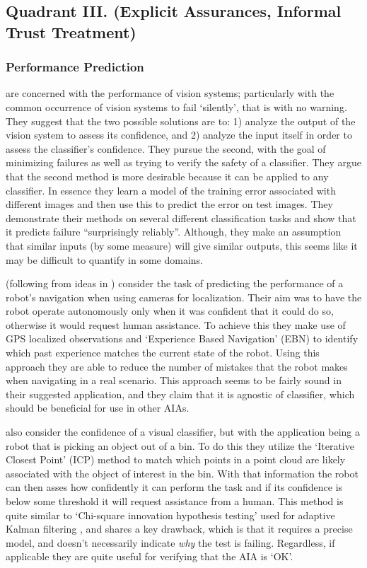 \subsection{Quadrant III. (Explicit Assurances, Informal Trust Treatment)}\label{sec:q3}
\subsubsection{Performance Prediction} \label{sec:performance_prediction}
    \citet{Zhang2014-he} are concerned with the performance of vision systems; particularly with the common occurrence of vision systems to fail `silently', that is with no warning. They suggest that the two possible solutions are to: 1) analyze the output of the vision system to assess its confidence, and 2) analyze the input itself in order to assess the classifier's confidence. They pursue the second, with the goal of minimizing failures as well as trying to verify the safety of a classifier. They argue that the second method is more desirable because it can be applied to any classifier. In essence they learn a model of the training error associated with different images and then use this to predict the error on test images. They demonstrate their methods on several different classification tasks and show that it predicts failure ``surprisingly reliably''. Although, they make an assumption that similar inputs (by some measure) will give similar outputs, this seems like it may be difficult to quantify in some domains.

    \citet{Gurau2016-hs} (following from ideas in \citet{Churchill2015-ei}) consider the task of predicting the performance of a robot's navigation when using cameras for localization. Their aim was to have the robot operate autonomously only when it was confident that it could do so, otherwise it would request human assistance. To achieve this they make use of GPS localized observations and `Experience Based Navigation' (EBN) to identify which past experience matches the current state of the robot. Using this approach they are able to reduce the number of mistakes that the robot makes when navigating in a real scenario. This approach seems to be fairly sound in their suggested application, and they claim that it is agnostic of classifier, which should be beneficial for use in other AIAs.

    \citet{Kaipa2015-hy} also consider the confidence of a visual classifier, but with the application being a robot that is picking an object out of a bin. To do this they utilize the `Iterative Closest Point' (ICP) method to match which points in a point cloud are likely associated with the object of interest in the bin. With that information the robot can then asses how confidently it can perform the task and if its confidence is below some threshold it will request assistance from a human. This method is quite similar to `Chi-square innovation hypothesis testing' used for adaptive Kalman filtering \cite{Bar-Shalom2001-tg}, and shares a key drawback, which is that it requires a precise model, and doesn't necessarily indicate \emph{why} the test is failing. Regardless, if applicable they are quite useful for verifying that the AIA is `OK'.

